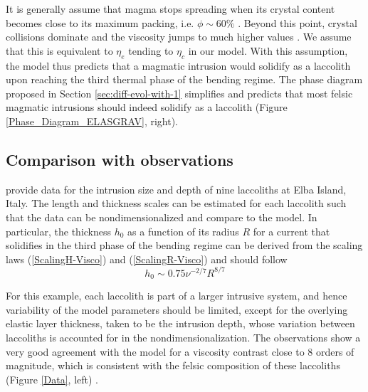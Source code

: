It is  generally assume  that magma stops  spreading when  its crystal
content becomes close  to its maximum packing, i.e.   $\phi \sim 60\%$
\citep{Pinkerton:1992fw}.   Beyond  this   point,  crystal  collisions
dominate   and   the   viscosity   jumps   to   much   higher   values
\citep{Lejeune:1995fc,Giordano:2008em}.   We   assume  that   this  is
equivalent to  $\eta_e$ tending to  $\eta_c$ in our model.   With this
assumption, the  model thus predicts  that a magmatic  intrusion would
solidify as a  laccolith upon reaching the third thermal  phase of the
bending   regime.     The   phase   diagram   proposed    in   Section
\ref{sec:diff-evol-with-1}  simplifies and  predicts that  most felsic
magmatic  intrusions should  indeed  solidify as  a laccolith  (Figure
\ref{Phase_Diagram_ELASGRAV}, right).

\subsection{Comparison with observations}
\label{sec:range-valu-dimens}

\citet{Rocchi:2002jy} provide data for the intrusion size and depth of
nine  laccoliths at  Elba  Island, Italy.   The  length and  thickness
scales can be  estimated for each laccolith such that  the data can be
nondimensionalized  and  compare to  the  model.   In particular,  the
thickness $h_0$  as a function  of its radius  $R$ for a  current that
solidifies in  the third phase  of the  bending regime can  be derived
from     the      scaling     laws      (\ref{ScalingH-Visco})     and
(\ref{ScalingR-Visco}) and should follow
\begin{equation}
  h_0 \sim 0.75\nu^{-2/7}R^{8/7}\label{Hr}
\end{equation}

For this example, each laccolith is part of a larger intrusive system,
and  hence variability  of  the model  parameters  should be  limited,
except  for the  overlying elastic  layer thickness,  taken to  be the
intrusion depth,  whose variation between laccoliths  is accounted for
in  the  nondimensionalization.  The  observations  show  a very  good
agreement with the model for a  viscosity contrast close to $8$ orders
of magnitude, which is consistent with the felsic composition of these
laccoliths            (Figure             \ref{Data},            left)
\citep{Marsh:1981dc,Diniega:2013eh}.

